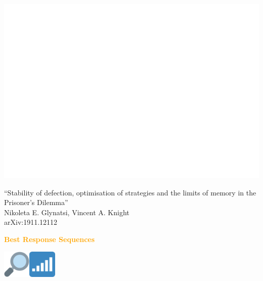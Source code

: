 \documentclass{beamer}
\begin{document}
\begin{frame}
    \begin{center}
    
    \end{center}
\end{frame}

\begin{frame}
    \begin{center}
    \includegraphics[width=.8\textwidth]{static/mem_one_against_longer_memory.png}
    \end{center}
\end{frame}

\begin{frame}
    \begin{center}
        \large{``Stability of defection, optimisation of strategies and the limits of memory in the Prisoner's Dilemma''} \\ \vspace{.5cm}
        \footnotesize{Nikoleta E. Glynatsi, Vincent A. Knight} \\ \vspace{.5cm}
        \footnotesize{arXiv:1911.12112}
    \end{center}
\end{frame}

\begin{frame}
    \begin{center}
    \textcolor{orange}{\large{\textbf{Best Response Sequences}}} \vspace{1cm}

    \includegraphics[width=0.10\textwidth]{static/look.png}\hspace{2pt}\includegraphics[width=0.10\textwidth]{static/sequence.png}
    \end{center}
\end{frame}
\end{document}
